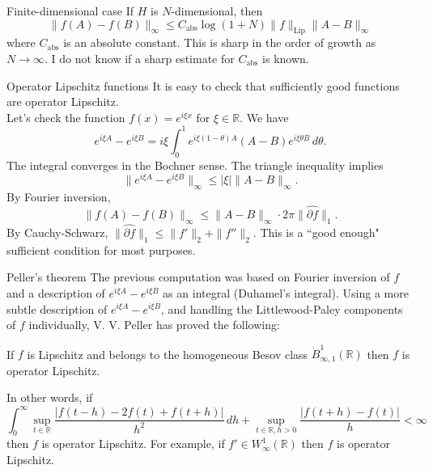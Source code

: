 \documentclass{beamer}
\numberwithin{equation}{section}
\theoremstyle{plain}
\theoremstyle{plain}
\theoremstyle{definition}
\theoremstyle{plain}
\theoremstyle{plain}
\theoremstyle{definition}
\newcommand{\Rl}{\mathbb{R}}
\begin{document}
\begin{frame}{Finite-dimensional case}
    If $H$ is $N$-dimensional, then
    \[
        \|f(A)-f(B)\|_{\infty} \leq C_{\mathrm{abs}}\log(1+N)\|f\|_{\mathrm{Lip}}\|A-B\|_{\infty}
    \]
    where $C_{\mathrm{abs}}$ is an absolute constant. This is sharp in the order of growth as $N\to\infty.$ I do not know if a sharp estimate for $C_{\mathrm{abs}}$ is known.
\end{frame}


\begin{frame}{Operator Lipschitz functions}
    It is easy to check that sufficiently good functions are operator Lipschitz.\\
    Let's check the function $f(x) = e^{i\xi x}$ for $\xi\in \Rl.$ We have
    \begin{equation*}
        e^{i\xi A}-e^{i\xi B} = i\xi\int_{0}^1 e^{i\xi (1-\theta)A}(A-B)e^{i\xi \theta B}\,d\theta.
    \end{equation*}
    The integral converges in the Bochner sense. The triangle inequality implies
    $$
        \|e^{i\xi A}-e^{i\xi B}\|_{\infty} \leq |\xi|\|A-B\|_{\infty}.
    $$
    \pause
    By Fourier inversion,
    \begin{equation*}
        \|f(A)-f(B)\|_{\infty} \leq \|A-B\|_\infty\cdot 2\pi \|\widehat{\partial f}\|_1.
    \end{equation*}
    \pause
    By Cauchy-Schwarz, $\|\widehat{\partial f}\|_1 \leq \|f'\|_2+\|f''\|_2.$ This is a ``good enough" sufficient condition for most purposes.
\end{frame}

\begin{frame}{Peller's theorem}
    The previous computation was based on Fourier inversion of $f$ and a description of $e^{i\xi A}-e^{i\xi B}$ as an integral (Duhamel's integral).
    \pause
    Using a more subtle description of $e^{i\xi A}-e^{i\xi B}$, and handling the Littlewood-Paley components of $f$
    individually, V. V. Peller has proved the following:
    \begin{theorem}[Peller (1990)]
        If $f$ is Lipschitz and belongs to the homogeneous Besov class $\dot{B}^1_{\infty,1}(\Rl)$ then $f$ is operator Lipschitz.
    \end{theorem}
    \pause
    In other words, if
    \begin{equation*}
        \int_0^\infty \sup_{t\in \Rl} \frac{|f(t-h)-2f(t)+f(t+h)|}{h^2} \,dh + \sup_{t\in \Rl,h> 0} \frac{|f(t+h)-f(t)|}{h} < \infty
    \end{equation*}
    then $f$ is operator Lipschitz. 
    \pause
    For example, if $f' \in W^{1}_{\infty}(\Rl)$ then $f$ is operator Lipschitz.
\end{frame}
\end{document}
